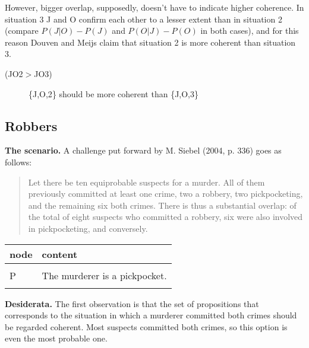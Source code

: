 \documentclass[10pt,]{scrartcl}
\newcommand{\s}[1]{\mbox{\textsf{#1}}}
\begin{document}
\vspace{2mm}

However, bigger overlap, supposedly, doesn't have to indicate higher
coherence. In situation 3 \s{J} and \s{O} confirm each other to a lesser
extent than in situation 2 (compare \(P(J|O)-P(J)\) and \(P(O|J)-P(O)\)
in both cases), and for this reason Douven and Meijs claim that
situation 2 is more coherent than situation 3. \vspace{2mm}

\begin{description}
    \item[(\s{JO2}$>$\s{JO3})]  \{\s{J,O,2}\} should be more coherent than \{\s{J,O,3}\}
\end{description}

\vspace{2mm}

\subsection{Robbers}

\textbf{The scenario.} A challenge put forward by M. Siebel (2004, p.
336) goes as follows:

\begin{quote}
    Let there be ten equiprobable suspects for a murder. All of them previously committed at least one crime, two a robbery, two pickpocketing, and the remaining six both crimes. There is thus a substantial overlap: of the total of eight suspects who committed a robbery, six were also involved in pickpocketing, and conversely. 
\end{quote}

\begin{table}[H]
\centering
\begin{tabular}{ll}
\toprule
node & content\\
\midrule
\cellcolor{gray!6}{W} & \cellcolor{gray!6}{Real perpetrator status (three possible states).}\\
P & The murderer is a pickpocket.\\
\cellcolor{gray!6}{R} & \cellcolor{gray!6}{The murderer is a robber.}\\
\bottomrule
\end{tabular}
\end{table}

\noindent  \textbf{Desiderata.} The first observation is that the set of
propositions that corresponds to the situation in which a murderer
committed both crimes should be regarded coherent. Most suspects
committed both crimes, so this option is even the most probable one.
\vspace{2mm}
\end{document}
